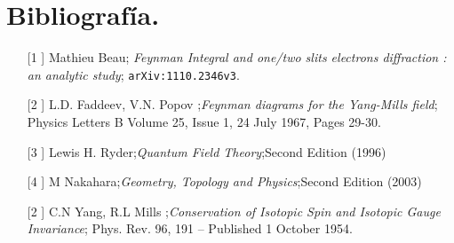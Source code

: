 \chapter{Bibliografía.}
\begin{itemize}
\item[[1]] Mathieu Beau; \textit{Feynman Integral and one/two slits electrons diffraction : an analytic study}; \texttt{arXiv:1110.2346v3}.
\item[[2]]  L.D. Faddeev,  V.N. Popov ;\textit{Feynman diagrams for the Yang-Mills field}; Physics Letters B Volume 25, Issue 1, 24 July 1967, Pages 29-30.
\item[[3]] Lewis H. Ryder;\textit{Quantum Field Theory};Second Edition (1996) 
\item[[4]] M Nakahara;\textit{Geometry, Topology and Physics};Second Edition (2003) 
\item[[2]]  C.N Yang,  R.L Mills ;\textit{Conservation of Isotopic Spin and Isotopic Gauge Invariance}; Phys. Rev. 96, 191 – Published 1 October 1954.
\end{itemize}